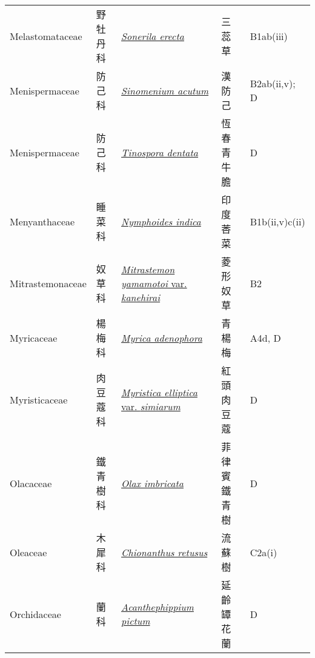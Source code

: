 {\begin{longtable}{p{2.5cm}p{2.5cm}p{4.5cm}p{2.5cm}p{3cm}}
    Melastomataceae & 野牡丹科 & \href{http://www.theplantlist.org/tpl1.1/search?q=Sonerila+erecta}{\textit{Sonerila erecta} } & 三蕊草 & B1ab(iii) \index{Sonerila@\textit{Sonerila}!erecta@\textit{erecta}}  \index{三蕊草} \\
    Menispermaceae & 防己科 & \href{http://www.theplantlist.org/tpl1.1/search?q=Sinomenium+acutum}{\textit{Sinomenium acutum} } & 漢防己 & B2ab(ii,v); D \index{Sinomenium@\textit{Sinomenium}!acutum@\textit{acutum}}  \index{漢防己} \\
    Menispermaceae & 防己科 & \href{http://www.theplantlist.org/tpl1.1/search?q=Tinospora+dentata}{\textit{Tinospora dentata} } & 恆春青牛膽 & D \index{Tinospora@\textit{Tinospora}!dentata@\textit{dentata}}  \index{恆春青牛膽} \\
    Menyanthaceae & 睡菜科 & \href{http://www.theplantlist.org/tpl1.1/search?q=Nymphoides+indica}{\textit{Nymphoides indica} } & 印度莕菜 & B1b(ii,v)c(ii) \index{Nymphoides@\textit{Nymphoides}!indica@\textit{indica}}  \index{印度莕菜} \\
    Mitrastemonaceae & 奴草科 & \href{http://www.theplantlist.org/tpl1.1/search?q=Mitrastemon+yamamotoi+var.+kanehirai}{\textit{Mitrastemon yamamotoi} var. \textit{kanehirai} } & 菱形奴草 & B2 \index{Mitrastemon@\textit{Mitrastemon}!yamamotoi@\textit{yamamotoi}!var. kanehirai@var. \textit{kanehirai}}  \index{菱形奴草} \\
    Myricaceae & 楊梅科 & \href{http://www.theplantlist.org/tpl1.1/search?q=Myrica+adenophora}{\textit{Myrica adenophora} } & 青楊梅 & A4d, D \index{Myrica@\textit{Myrica}!adenophora@\textit{adenophora}}  \index{青楊梅} \\
    Myristicaceae & 肉豆蔻科 & \href{http://www.theplantlist.org/tpl1.1/search?q=Myristica+elliptica+var.+simiarum}{\textit{Myristica elliptica} var. \textit{simiarum} } & 紅頭肉豆蔻 & D \index{Myristica@\textit{Myristica}!elliptica@\textit{elliptica}!var. simiarum@var. \textit{simiarum}}  \index{紅頭肉豆蔻} \\
    Olacaceae & 鐵青樹科 & \href{http://www.theplantlist.org/tpl1.1/search?q=Olax+imbricata}{\textit{Olax imbricata} } & 菲律賓鐵青樹 & D \index{Olax@\textit{Olax}!imbricata@\textit{imbricata}}  \index{菲律賓鐵青樹} \\
    Oleaceae & 木犀科 & \href{http://www.theplantlist.org/tpl1.1/search?q=Chionanthus+retusus}{\textit{Chionanthus retusus} } & 流蘇樹 & C2a(i) \index{Chionanthus@\textit{Chionanthus}!retusus@\textit{retusus}}  \index{流蘇樹} \\
    Orchidaceae & 蘭科 & \href{http://www.theplantlist.org/tpl1.1/search?q=Acanthephippium+pictum}{\textit{Acanthephippium pictum} } & 延齡罈花蘭 & D \index{Acanthephippium@\textit{Acanthephippium}!pictum@\textit{pictum}}  \index{延齡罈花蘭} \\

\end{longtable}}

